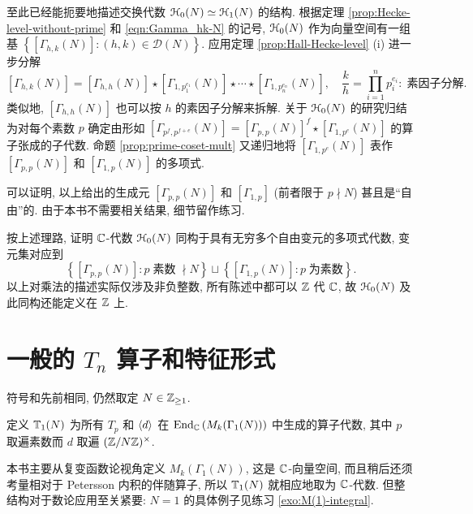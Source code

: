 至此已经能扼要地描述交换代数 $\EuScript{H}_0(N) \simeq \EuScript{H}_1(N)$ 的结构. 根据定理 \ref{prop:Hecke-level-without-prime} 和 \eqref{eqn:Gamma_hk-N} 的记号, $\EuScript{H}_0(N)$ 作为向量空间有一组基 $\left\{ [\Gamma_{h,k}(N)] : (h,k) \in \mathcal{D}(N) \right\}$. 应用定理 \ref{prop:Hall-Hecke-level} (i) 进一步分解
\[ [\Gamma_{h,k}(N)] = [\Gamma_{h,h}(N)] \star \left[\Gamma_{1, p_1^{e_1}}(N)\right] \star \cdots \star \left[\Gamma_{1, p_n^{e_n}}(N) \right], \quad \frac{k}{h} = \prod_{i=1}^n p_i^{e_i}: \; \text{素因子分解}. \]
类似地, $[\Gamma_{h,h}(N)]$ 也可以按 $h$ 的素因子分解来拆解. 关于 $\EuScript{H}_0(N)$ 的研究归结为对每个素数 $p$ 确定由形如 $\left[ \Gamma_{p^f, p^{f+e}}(N) \right] = \left[ \Gamma_{p, p}(N) \right]^f \star \left[ \Gamma_{1, p^e}(N) \right]$ 的算子张成的子代数. 命题 \ref{prop:prime-coset-mult} 又递归地将 $\left[ \Gamma_{1, p^e}(N) \right]$ 表作 $\left[ \Gamma_{p, p}(N) \right]$ 和 $\left[ \Gamma_{1, p}(N) \right]$ 的多项式.

可以证明, 以上给出的生成元 $\left[ \Gamma_{p, p}(N) \right]$ 和 $\left[ \Gamma_{1, p} \right]$ (前者限于 $p \nmid N$) 甚且是``自由''的. 由于本书不需要相关结果, 细节留作练习.

\begin{exercise}
	按上述理路, 证明 $\mathbb{C}$-代数 $\EuScript{H}_0(N)$ 同构于具有无穷多个自由变元的多项式代数, 变元集对应到
	\[ \left\{ \left[\Gamma_{p,p}(N)\right] : p \;\text{素数}\; \nmid N \right\} \sqcup \left\{ \left[\Gamma_{1,p}(N)\right] : p \;\text{为素数} \right\}. \]
	以上对乘法的描述实际仅涉及非负整数, 所有陈述中都可以 $\mathbb{Z}$ 代 $\mathbb{C}$, 故 $\EuScript{H}_0(N)$ 及此同构还能定义在 $\mathbb{Z}$ 上.
\end{exercise}

\section{一般的 \texorpdfstring{$T_n$}{Tn} 算子和特征形式}\label{sec:congruence-Hecke-2}

符号和先前相同, 仍然取定 $N \in \mathbb{Z}_{\geq 1}$.

\begin{definition}[Hecke 代数]\label{def:T_n}  
	定义 $\mathbb{T}_1(N)$ 为所有 $T_p$ 和 $\left\langle d \right\rangle$ 在 $\operatorname{End}_{\mathbb{C}}\left(M_k(\Gamma_1(N))\right)$ 中生成的算子代数, 其中 $p$ 取遍素数而 $d$ 取遍 $(\mathbb{Z}/N\mathbb{Z})^\times$.
\end{definition}

本书主要从复变函数论视角定义 $M_k(\Gamma_1(N))$, 这是 $\mathbb{C}$-向量空间, 而且稍后还须考量相对于 Petersson 内积的伴随算子, 所以 $\mathbb{T}_1(N)$ 就相应地取为 $\mathbb{C}$-代数. 但整结构对于数论应用至关紧要: $N = 1$ 的具体例子见练习 \ref{exo:M(1)-integral}.

